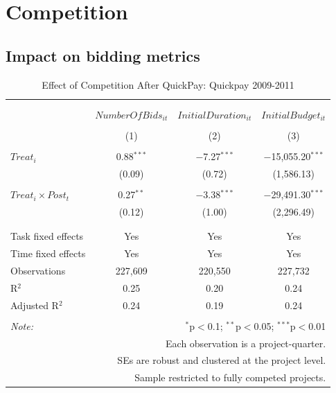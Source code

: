 \documentclass[
]{article}
\begin{document}
\hypertarget{competition}{%
\section{Competition}\label{competition}}

\hypertarget{impact-on-bidding-metrics}{%
\subsection{Impact on bidding metrics}\label{impact-on-bidding-metrics}}

\begin{table}[H] \centering 
  \caption{Effect of Competition After QuickPay: Quickpay 2009-2011} 
  \label{} 
\small 
\begin{tabular}{@{\extracolsep{0pt}}lccc} 
\\[-1.8ex]\hline 
\hline \\[-1.8ex] 
\\[-1.8ex] & $NumberOfBids_{it}$ & $InitialDuration_{it}$ & $InitialBudget_{it}$ \\ 
\\[-1.8ex] & (1) & (2) & (3)\\ 
\hline \\[-1.8ex] 
 $Treat_i$ & 0.88$^{***}$ & $-$7.27$^{***}$ & $-$15,055.20$^{***}$ \\ 
  & (0.09) & (0.72) & (1,586.13) \\ 
  & & & \\ 
 $Treat_i \times Post_t$ & 0.27$^{**}$ & $-$3.38$^{***}$ & $-$29,491.30$^{***}$ \\ 
  & (0.12) & (1.00) & (2,296.49) \\ 
  & & & \\ 
\hline \\[-1.8ex] 
Task fixed effects & Yes & Yes & Yes \\ 
Time fixed effects & Yes & Yes & Yes \\ 
Observations & 227,609 & 220,550 & 227,732 \\ 
R$^{2}$ & 0.25 & 0.20 & 0.24 \\ 
Adjusted R$^{2}$ & 0.24 & 0.19 & 0.24 \\ 
\hline 
\hline \\[-1.8ex] 
\textit{Note:}  & \multicolumn{3}{r}{$^{*}$p$<$0.1; $^{**}$p$<$0.05; $^{***}$p$<$0.01} \\ 
 & \multicolumn{3}{r}{Each observation is a project-quarter.} \\ 
 & \multicolumn{3}{r}{SEs are robust and clustered at the project level.} \\ 
 & \multicolumn{3}{r}{Sample restricted to fully competed projects.} \\ 
\end{tabular} 
\end{table}
\end{document}
